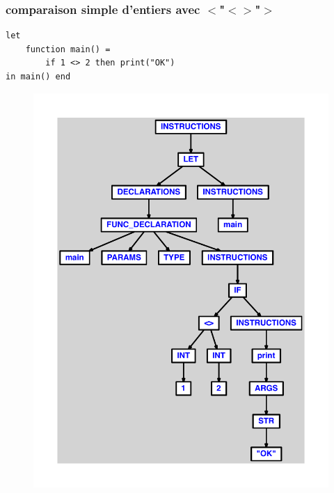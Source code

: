 \documentclass{article}
\begin{document}
\subsubsection{comparaison simple d'entiers avec $ < $"$ < $$ > $"$ > $}
\begin{lstlisting}
let
	function main() =
		if 1 <> 2 then print("OK")
in main() end
\end{lstlisting}
\newpage
\begin{figure}[H]
\centering
\includegraphics[max width=\textwidth]{ast/ast_172.pdf}
\end{figure}
\newpage
\end{document}
